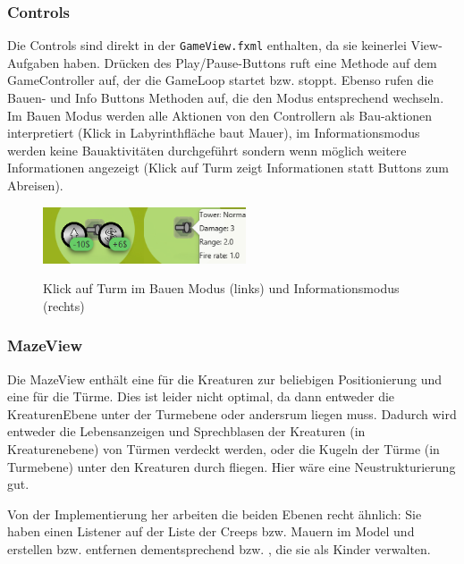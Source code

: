 \subsubsection{Controls} %
\label{ssub:controls}
Die Controls sind direkt in der \texttt{GameView.fxml} enthalten, da sie keinerlei View-Aufgaben haben. Drücken des Play/Pause-Buttons ruft eine Methode auf dem GameController auf, der die GameLoop startet bzw. stoppt. Ebenso rufen die Bauen- und Info Buttons Methoden auf, die den Modus entsprechend wechseln. Im Bauen Modus werden alle Aktionen von den Controllern als Bau-aktionen interpretiert (Klick in Labyrinthfläche baut Mauer), im Informationsmodus werden keine Bauaktivitäten durchgeführt sondern wenn möglich weitere Informationen angezeigt (Klick auf Turm zeigt Informationen statt Buttons zum Abreisen).
\begin{figure}[htb]
  \centering
  \includegraphics[width=3cm]{images/klick-bauen.png}\hspace{1cm}\includegraphics[width=3cm]{images/klick-informationen.png}
  \caption{Klick auf Turm im Bauen Modus (links) und Informationsmodus (rechts)}
\end{figure}

\subsubsection{MazeView} %
\label{ssub:mazeview}
Die MazeView enthält eine  für die Kreaturen zur beliebigen Positionierung und eine  für die Türme. Dies ist leider nicht optimal, da dann entweder die KreaturenEbene unter der Turmebene oder andersrum liegen muss. Dadurch wird entweder die Lebensanzeigen und Sprechblasen der Kreaturen (in Kreaturenebene) von Türmen verdeckt werden, oder die Kugeln der Türme (in Turmebene) unter den Kreaturen durch fliegen. Hier wäre eine Neustrukturierung gut.

Von der Implementierung her arbeiten die beiden Ebenen recht ähnlich: Sie haben einen Listener auf der Liste der Creeps bzw. Mauern im Model und erstellen bzw. entfernen dementsprechend  bzw. , die sie als Kinder verwalten.

